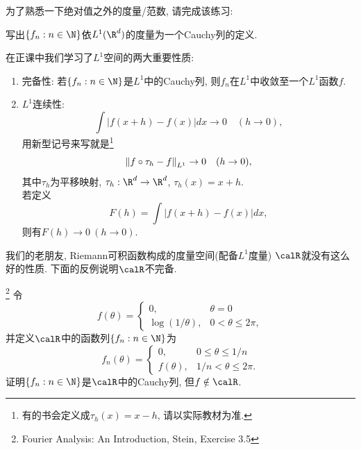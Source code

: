 为了熟悉一下绝对值之外的度量/范数, 请完成该练习:
\begin{exercise}
    写出$\{f_n:n \in \N\}$依$L^1(\R^d)$的度量为一个Cauchy列的定义. 
\end{exercise}

在正课中我们学习了$L^1$空间的两大重要性质:
\begin{enumerate}
    \item 完备性: 若$\{f_n:n \in \N\}$是$L^1$中的Cauchy列, 则$f_n$在$L^1$中收敛至一个$L^1$函数$f$. 
    \item $L^1$连续性:
    $$\int |f(x+h)-f(x)|dx \to 0 \quad (h \to 0), $$
    用新型记号来写就是\footnote{有的书会定义成$\tau_h(x)=x-h$, 请以实际教材为准.}
    $$\norm{f \circ \tau_h - f}_{L^1} \to 0 \quad (h \to 0),$$
    其中$\tau_h$为平移映射, $\tau_h: \R^d \to \R^d$, $\tau_h(x) = x+h$. \\
    若定义$$F(h)=\int |f(x+h)-f(x)|dx,$$
    则有$F(h) \to 0~(h \to 0)$. 
\end{enumerate}


我们的老朋友, Riemann可积函数构成的度量空间(配备$L^1$度量)
$\calR$就没有这么好的性质. 
下面的反例说明$\calR$不完备.

\begin{example}\footnote{Fourier Analysis: An Introduction, Stein, Exercise 3.5}
    令
    $$f(\theta) = \begin{cases}
        0, & \theta = 0 \\
        \log(1/\theta), & 0 < \theta \leq 2\pi,
    \end{cases}$$
    并定义$\calR$中的函数列$\{f_n: n \in \N\}$为
    $$f_n(\theta) = \begin{cases}
        0,         & 0 \leq \theta \leq 1/n \\
        f(\theta), & 1/n < \theta \leq 2\pi.
    \end{cases}$$
    证明$\{f_n: n \in \N\}$是$\calR$中的Cauchy列, 但$f \notin \calR$. 
\end{example}

